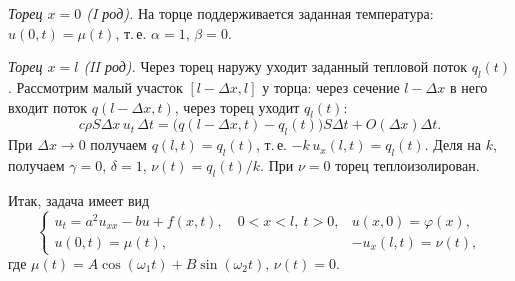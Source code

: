 \emph{Торец $x=0$ (I род).} На торце поддерживается заданная температура: $u(0,t)=\mu(t)$, т.\,е. $\alpha=1$, $\beta=0$.

\emph{Торец $x=l$ (II род).} Через торец наружу уходит заданный тепловой поток $q_l(t)$. Рассмотрим малый участок $[l-\Delta x,l]$ у торца: через сечение $l-\Delta x$ в него входит поток $q(l-\Delta x,t)$, через торец уходит $q_l(t)$:
\[
c\rho S\Delta x\,u_t\,\Delta t=\bigl(q(l-\Delta x,t)-q_l(t)\bigr)S\Delta t+O(\Delta x)\Delta t .
\]
При $\Delta x\to0$ получаем $q(l,t)=q_l(t)$, т.\,е. $-k\,u_x(l,t)=q_l(t)$. Деля на $k$, получаем $\gamma=0$, $\delta=1$, $\nu(t)=q_l(t)/k$. При $\nu=0$ торец теплоизолирован.

Итак, задача имеет вид
\[
\begin{cases}
u_t=a^2u_{xx}-bu+f(x,t),\quad 0<x<l,\ t>0, & u(x,0)=\varphi(x),\\
u(0,t)=\mu(t), & -u_x(l,t)=\nu(t),
\end{cases}
\]
где $\mu(t)=A\cos(\omega_1t)+B\sin(\omega_2t)$, $\nu(t)=0$.
